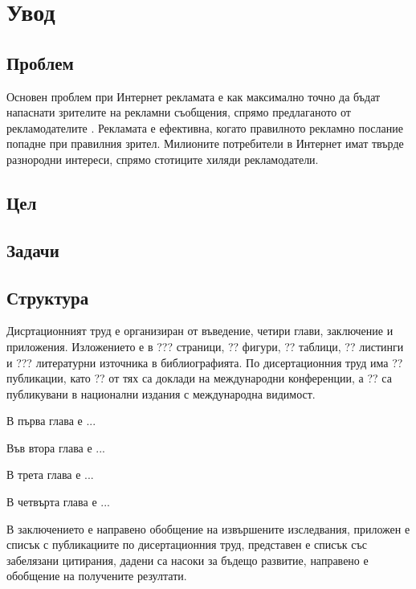 \chapter*{Увод}

\section*{Проблем}

Основен проблем при Интернет рекламата е как максимално точно да бъдат напаснати зрителите на рекламни съобщения, спрямо предлаганото от рекламодателите \cite{MIRALLESPECHUAN201839}. Рекламата е ефективна, когато правилното рекламно послание попадне при правилния зрител. Милионите потребители в Интернет имат твърде разнородни интереси, спрямо стотиците хиляди рекламодатели. 

\section*{Цел}

\section*{Задачи}

\section*{Структура}

Дисртационният труд е организиран от въведение, четири глави, заключение и приложения. Изложението е в ??? страници, ?? фигури, ?? таблици, ?? листинги и ??? литературни източника в библиографията. По дисертационния труд има ?? публикации, като ?? от тях са доклади на международни конференции, а ?? са публикувани в национални издания с международна видимост. 

В първа глава е ...

Във втора глава е ...

В трета глава е ...

В четвърта глава е ...

В заключението е направено обобщение на извършените изследвания, приложен е списък с публикациите по дисертационния труд, представен е списък със забелязани цитирания, дадени са насоки за бъдещо развитие, направено е обобщение на получените резултати.
